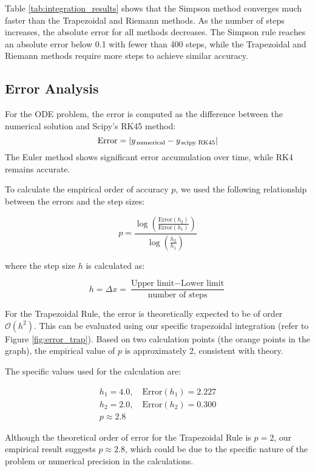 \documentclass[twocolumn, 11pt]{article}
\begin{document}
Table \ref{tab:integration_results} shows that the Simpson method converges much faster than the Trapezoidal and Riemann methods. As the number of steps increases, the absolute error for all methods decreases. The Simpson rule reaches an absolute error below 0.1 with fewer than 400 steps, while the Trapezoidal and Riemann methods require more steps to achieve similar accuracy.


\subsection{Error Analysis}
For the ODE problem, the error is computed as the difference between the numerical solution and Scipy’s RK45 method:
\begin{equation}
\text{Error} = |y_{\text{\,numerical}} - y_{\text{\,scipy RK45}}|
\end{equation}
The Euler method shows significant error accumulation over time, while RK4 remains accurate.

 To calculate the empirical order of accuracy \(p\), we used the following relationship between the errors and the step sizes:

\[
p = \frac{\log\left( \frac{\text{Error}(h_2)}{\text{Error}(h_1)} \right)}{\log\left( \frac{h_2}{h_1} \right)}
\]

where the step size \(h\) is calculated as:

\begin{equation}
    h = \Delta x = \frac{\text{Upper limit} - \text{Lower limit}}{\text{number of steps}}
\end{equation}

For the Trapezoidal Rule, the error is theoretically expected to be of order \(\mathcal{O}(h^2)\). This can be evaluated using our specific trapezoidal integration (refer to Figure \ref{fig:error_trap}). Based on two calculation points (the orange points in the graph), the empirical value of \(p\) is approximately 2, consistent with theory.

The specific values used for the calculation are:

\begin{gather*}
    h_1 = 4.0,\quad \text{Error}(h_1) = 2.227 \\
    h_2 = 2.0,\quad \text{Error}(h_2) = 0.300 \\
    p \approx 2.8
\end{gather*}

Although the theoretical order of error for the Trapezoidal Rule is \(p = 2\), our empirical result suggests \(p \approx 2.8\), which could be due to the specific nature of the problem or numerical precision in the calculations.
\end{document}
